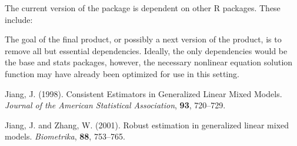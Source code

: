 \documentclass[11pt]{article}\usepackage[]{graphicx}\usepackage[]{color}
\begin{document}
The current version of the package is dependent on other R packages.  These include:

The goal of the final product, or possibly a next version of the product, is to remove all but essential dependencies.  Ideally, the only dependencies would be the base and stats packages, however, the necessary nonlinear equation solution function may have already been optimized for use in this setting.  

\begin{thebibliography}{}

Jiang, J. (1998).
\newblock Consistent Estimators in Generalized Linear Mixed Models.
\newblock \emph{Journal of the American Statistical Association}, \textbf{93}, 720--729.

Jiang, J. and Zhang, W. (2001).
\newblock Robust estimation in generalized linear mixed models.
\newblock \emph{Biometrika}, \textbf{88}, 753--765.

\end{thebibliography}
\end{document}
